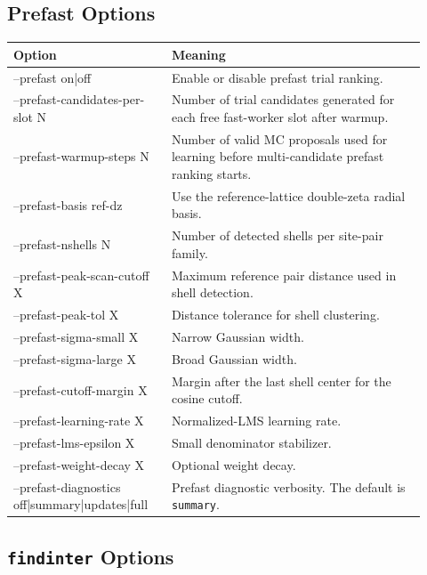\documentclass[11pt]{article}
\begin{document}
\subsection{Prefast Options}

\begin{longtable}{>{\ttfamily}p{0.34\linewidth}p{0.58\linewidth}}
\toprule
Option & Meaning \\
\midrule
\endhead
--prefast on|off & Enable or disable prefast trial ranking. \\
--prefast-candidates-per-slot N & Number of trial candidates generated for each free fast-worker slot after warmup. \\
--prefast-warmup-steps N & Number of valid MC proposals used for learning before multi-candidate prefast ranking starts. \\
--prefast-basis ref-dz & Use the reference-lattice double-zeta radial basis. \\
--prefast-nshells N & Number of detected shells per site-pair family. \\
--prefast-peak-scan-cutoff X & Maximum reference pair distance used in shell detection. \\
--prefast-peak-tol X & Distance tolerance for shell clustering. \\
--prefast-sigma-small X & Narrow Gaussian width. \\
--prefast-sigma-large X & Broad Gaussian width. \\
--prefast-cutoff-margin X & Margin after the last shell center for the cosine cutoff. \\
--prefast-learning-rate X & Normalized-LMS learning rate. \\
--prefast-lms-epsilon X & Small denominator stabilizer. \\
--prefast-weight-decay X & Optional weight decay. \\
--prefast-diagnostics off|summary|updates|full & Prefast diagnostic verbosity. The default is \texttt{summary}. \\
\bottomrule
\end{longtable}

\subsection{\texttt{findinter} Options}
\end{document}
